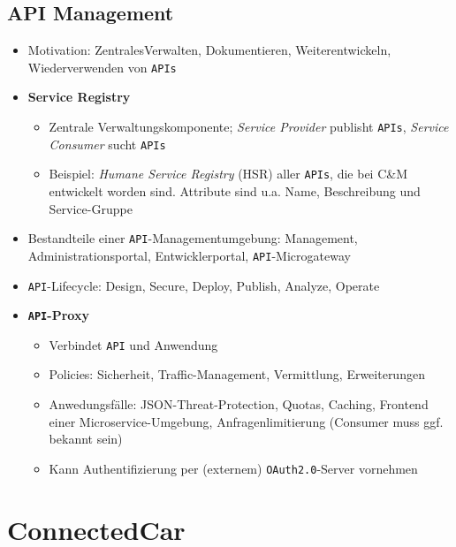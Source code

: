 \subsection{API Management}
\begin{itemize}
	\item Motivation: ZentralesVerwalten, Dokumentieren, Weiterentwickeln, Wiederverwenden von \texttt{APIs}
	\item \textbf{Service Registry}
	\begin{itemize}
		\item Zentrale Verwaltungskomponente; \textit{Service Provider} publisht \texttt{APIs}, \textit{Service Consumer} sucht \texttt{APIs}
		\item Beispiel: \textit{Humane Service Registry} (HSR) aller \texttt{APIs}, die bei C\&M entwickelt worden sind. Attribute sind u.a. Name, Beschreibung und Service-Gruppe
	\end{itemize}
	\item Bestandteile einer \texttt{API}-Managementumgebung: Management, Administrationsportal, Entwicklerportal, \texttt{API}-Microgateway
	\item \texttt{API}-Lifecycle: Design, Secure, Deploy, Publish, Analyze, Operate
	\item \textbf{\texttt{API}-Proxy}
	\begin{itemize}
		\item Verbindet \texttt{API} und Anwendung
		\item Policies: Sicherheit, Traffic-Management, Vermittlung, Erweiterungen
		\item Anwedungsfälle: JSON-Threat-Protection, Quotas, Caching, Frontend einer Microservice-Umgebung, Anfragenlimitierung (Consumer muss ggf. bekannt sein)
		\item Kann Authentifizierung per (externem) \texttt{OAuth2.0}-Server vornehmen
	\end{itemize}
\end{itemize}



\section{ConnectedCar}

